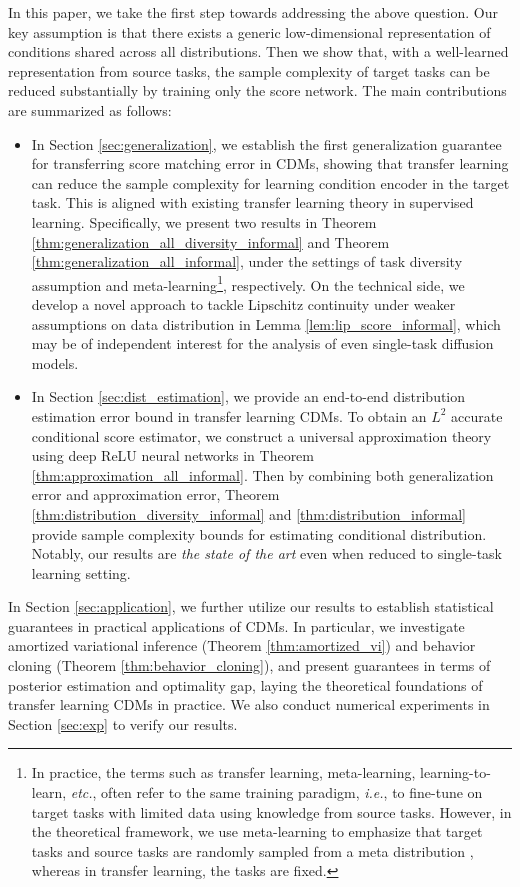 \documentclass{article}
\numberwithin{equation}{section}
\theoremstyle{definition}
\begin{document}
In this paper, we take the first step towards addressing the above question.
Our key assumption is that there exists a generic low-dimensional representation of conditions shared across all distributions.
Then we show that, with a well-learned representation from source tasks, the sample complexity of target tasks can be reduced substantially by training only the score network.  
The main contributions are summarized as follows:
\begin{itemize}[leftmargin=1em]
    \item In Section \ref{sec:generalization}, we establish the first generalization guarantee for transferring score matching error in CDMs, showing that transfer learning can reduce the sample complexity for learning condition encoder in the target task.
    This is aligned with existing transfer learning theory in supervised learning.
    Specifically, we present two results in Theorem \ref{thm:generalization_all_diversity_informal} and Theorem \ref{thm:generalization_all_informal}, under the settings of task diversity assumption and meta-learning\footnote{In practice, the terms such as transfer learning, meta-learning, learning-to-learn, \textit{etc.}, often refer to the same training paradigm, \textit{i.e.}, to fine-tune on target tasks with limited data using knowledge from source tasks. However, in the theoretical framework, we use meta-learning to emphasize that target tasks and source tasks are randomly sampled from a meta distribution \citep{baxter2000model}, whereas in transfer learning, the tasks are fixed.}, respectively.
    On the technical side, we develop a novel approach to tackle Lipschitz continuity under weaker assumptions on data distribution in Lemma \ref{lem:lip_score_informal}, which may be of independent interest for the analysis of even single-task diffusion models.
    \item In Section \ref{sec:dist_estimation}, we provide an end-to-end distribution estimation error bound in transfer learning CDMs.
    To obtain an $L^2$ accurate conditional score estimator, we construct a universal approximation theory using deep ReLU neural networks in Theorem \ref{thm:approximation_all_informal}. 
    Then by combining both generalization error and approximation error, Theorem \ref{thm:distribution_diversity_informal} and \ref{thm:distribution_informal} provide sample complexity bounds for estimating conditional distribution. 
    Notably, our results are \textit{the state of the art} even when reduced to single-task learning setting. 
\end{itemize}
In Section \ref{sec:application}, we further utilize our results to establish statistical guarantees in practical applications of CDMs.
In particular, we investigate amortized variational inference (Theorem \ref{thm:amortized_vi}) and behavior cloning (Theorem \ref{thm:behavior_cloning}), and present guarantees in terms of posterior estimation and optimality gap, laying the theoretical foundations of transfer learning CDMs in practice. We also conduct numerical experiments in Section \ref{sec:exp} to verify our results.
\end{document}

